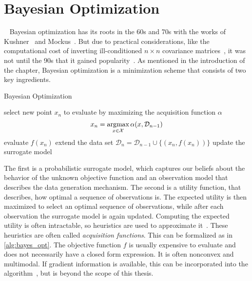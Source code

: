 \section{Bayesian Optimization}~\label{sec:bayes_opt}
%     
% 
% 
% 
% 
Bayesian optimization has its roots in the 60s and 70s with the works of Kushner~\cite{kushner1962versatile} and Mockus~\cite{vzilinskas1972bayes}. 
But due to practical considerations, like the computational cost of inverting ill-conditioned \( n \times n \) covariance matrices~\cite{zhigljavsky2021bayesian}, it was not until the 90s that it gained popularity~\cite{jones1998efficient}.
As mentioned in the introduction of the chapter, Bayesian optimization is a minimization scheme that consists of two key ingredients.
% 
\begin{algorithm}
    \caption{Bayesian Optimization}\label{alg:bayes_opt}
    \begin{algorithmic}[1]
        \State select new point $x_{n}$ to evaluate by maximizing the acquisition function $\alpha$
        \[
            x_{n} = \operatorname*{argmax}_{x \in \mathcal{X}} \alpha(x,\mathcal{D}_{n-1})
        \]
        \State evaluate $f(x_{n})$
        \State extend the data set $\mathcal{D}_{n} = \mathcal{D}_{n-1} \cup \{ (x_{n}, f(x_{n})) \}$
        \State update the surrogate model
        \EndFor
    \end{algorithmic}
\end{algorithm} 
% 
% 
% 
% 
The first is a probabilistic surrogate model, which captures our beliefs about the behavior of the unknown objective function and an observation model that describes the data generation mechanism. 
The second is a utility function, that describes, how optimal a sequence of observations is.
The expected utility is then maximized to select an optimal sequence of observations, while after each observation the surrogate model is again updated.
Computing the expected utility is often intractable, so heuristics are used to approximate it~\cite{shahriari2015taking}. These heuristics are often called \textit{acquisition functions}.
This can be formalized as in \cref{alg:bayes_opt}.
The objective function $f$ is usually expensive to evaluate and does not necessarily have a closed form expression. 
It is often nonconvex and multimodal. 
If gradient information is available, this can be incorporated into the algorithm~\cite[Sec. 4.2.1]{lizotte2008practical}, but is beyond the scope of this thesis.

